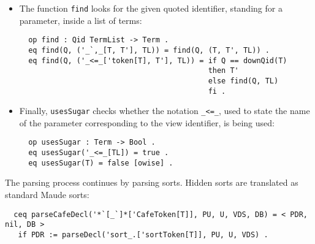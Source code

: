 \begin{itemize}
\item
The function \verb"find" looks for the given quoted identifier, standing for a
parameter, inside a list of terms:

{\codesize
\begin{verbatim}
  op find : Qid TermList -> Term .
  eq find(Q, ('_`,_[T, T'], TL)) = find(Q, (T, T', TL)) .
  eq find(Q, ('_<=_['token[T], T'], TL)) = if Q == downQid(T)
                                           then T'
                                           else find(Q, TL)
                                           fi .
\end{verbatim}
}

\item
Finally, \verb"usesSugar" checks whether the notation \verb"_<=_", used to state
the name of the parameter corresponding to the view identifier, is being used:

{\codesize
\begin{verbatim}
  op usesSugar : Term -> Bool .
  eq usesSugar('_<=_[TL]) = true .
  eq usesSugar(T) = false [owise] .
\end{verbatim}
}

\end{itemize}

The parsing process continues by parsing sorts. Hidden sorts are translated
as standard Maude sorts:

{\codesize
\begin{verbatim}
  ceq parseCafeDecl('*`[_`]*['CafeToken[T]], PU, U, VDS, DB) = < PDR, nil, DB >
   if PDR := parseDecl('sort_.['sortToken[T]], PU, U, VDS) .
\end{verbatim}
}

